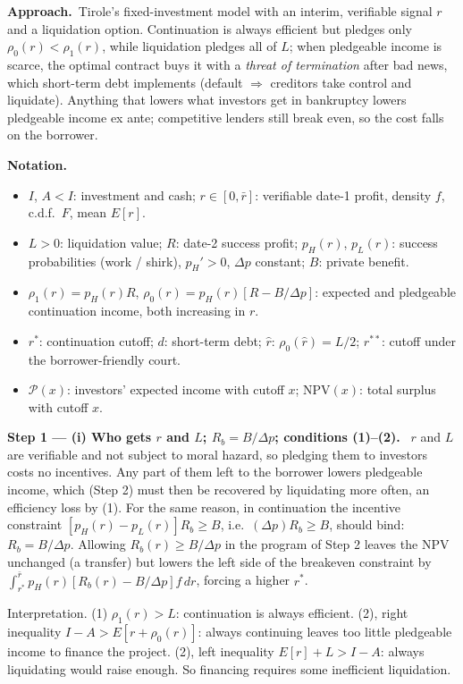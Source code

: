 \documentclass[11pt,a4paper]{article}
\newcommand{\notation}{\par\noindent\textbf{Notation.}}
\newcommand{\step}[2]{\par\medskip\noindent\textbf{Step #1 --- #2.}~}
\newcommand{\approach}{\par\smallskip\noindent\textbf{Approach.}~}
\begin{document}
\approach Tirole's fixed-investment model with an interim, verifiable signal $r$ and a liquidation
option. Continuation is always efficient but pledges only $\rho_0(r)<\rho_1(r)$, while liquidation
pledges all of $L$; when pledgeable income is scarce, the optimal contract buys it with a \emph{threat of
termination} after bad news, which short-term debt implements (default $\Rightarrow$ creditors take control
and liquidate). Anything that lowers what investors get in bankruptcy lowers pledgeable income ex ante;
competitive lenders still break even, so the cost falls on the borrower.

\notation
\begin{itemize}
  \item $I$, $A<I$: investment and cash; $r\in[0,\bar r]$: verifiable date-1 profit, density $f$, c.d.f.\ $F$, mean $E[r]$.
  \item $L>0$: liquidation value; $R$: date-2 success profit; $p_H(r)$, $p_L(r)$: success probabilities (work / shirk), $p_H'>0$, $\Delta p$ constant; $B$: private benefit.
  \item $\rho_1(r)=p_H(r)R$, $\rho_0(r)=p_H(r)[R-B/\Delta p]$: expected and pledgeable continuation income, both increasing in $r$.
  \item $r^*$: continuation cutoff; $d$: short-term debt; $\hat r$: $\rho_0(\hat r)=L/2$; $r^{**}$: cutoff under the borrower-friendly court.
  \item $\mathcal P(x)$: investors' expected income with cutoff $x$; $\text{NPV}(x)$: total surplus with cutoff $x$.
\end{itemize}

\step{1}{(i) Who gets $r$ and $L$; $R_b=B/\Delta p$; conditions (1)--(2)} $r$ and $L$ are verifiable and not subject to moral hazard, so
pledging them to investors costs no incentives. Any part of them left to the borrower lowers pledgeable income, which (Step 2) must then be
recovered by liquidating more often, an efficiency loss by (1). For the same reason, in continuation the incentive constraint
$[p_H(r)-p_L(r)]R_b\ge B$, i.e.\ $(\Delta p)R_b\ge B$, should bind: $R_b=B/\Delta p$. Allowing $R_b(r)\ge B/\Delta p$ in the program of Step 2 leaves the NPV
unchanged (a transfer) but lowers the left side of the breakeven constraint by $\int_{r^*}^{\bar r}p_H(r)[R_b(r)-B/\Delta p]f\,dr$, forcing a higher $r^*$.

Interpretation. (1) $\rho_1(r)>L$: continuation is always efficient. (2), right inequality $I-A>E[r+\rho_0(r)]$: always continuing
leaves too little pledgeable income to finance the project. (2), left inequality $E[r]+L>I-A$: always liquidating would raise enough.
So financing requires some inefficient liquidation.
\end{document}
